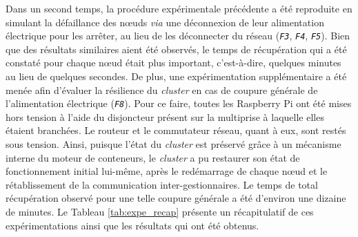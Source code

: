 Dans un second temps, la procédure expérimentale précédente a été reproduite en simulant la défaillance des n\oe{}uds \textit{via} une déconnexion de leur alimentation électrique pour les arrêter, au lieu de les déconnecter du réseau (\textit{\texttt{F3}}, \textit{\texttt{F4}}, \textit{\texttt{F5}}). Bien que des résultats similaires aient été observés, le temps de récupération qui a été constaté pour chaque n\oe{}ud était plus important, c'est-à-dire, quelques minutes au lieu de quelques secondes. De plus, une expérimentation supplémentaire a été menée afin d'évaluer la résilience du \textit{cluster} en cas de coupure générale de l'alimentation électrique (\textit{\texttt{F8}}). Pour ce faire, toutes les Raspberry Pi ont été mises hors tension à l'aide du disjoncteur présent sur la multiprise à laquelle elles étaient branchées. Le routeur et le commutateur réseau, quant à eux, sont restés sous tension. Ainsi, puisque l'état du \textit{cluster} est préservé grâce à un mécanisme interne du moteur de conteneurs, le \textit{cluster} a pu restaurer son état de fonctionnement initial lui-même, après le redémarrage de chaque n\oe{}ud et le rétablissement de la communication inter-gestionnaires. Le temps de total récupération observé pour une telle coupure générale a été d'environ une dizaine de minutes. Le Tableau \ref{tab:expe_recap} présente un récapitulatif de ces expérimentations ainsi que les résultats qui ont été obtenus.

